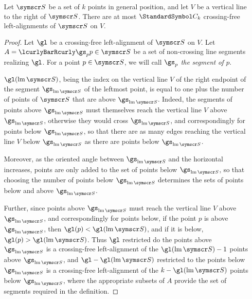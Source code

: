 \documentclass[10pt, a4paper, twoside]{basestyle}
\DeclareMathOperator{\leftmost}{lm}
\newcommand{\CatalanNumber}[1]{\StandardSymbol C_{#1}}
\newcommand{\pointset}{\symscr}
\begin{document}
\begin{lemma}
Let ${\pointset S}$ be a set of $k$ points in general position, and let $V$ be a vertical line to the right of ${\pointset S}$.
There are at most $\CatalanNumber k$ crossing-free left-alignments of ${\pointset S}$ on $V$.
\begin{proof}
Let $\gl$ be a crossing-free left-alignment of ${\pointset S}$ on $V$.
Let $A=\setst{\gs_p}{p\in{\pointset S}}$ be a set of non-crossing line segments realizing $\gl$.
For a point $p\in{\pointset S}$, we will call $\gs_p$ \emph{the segment of $p$}.

$\gl(\leftmost\pointset S)$, being the index on the vertical line $V$ of the right endpoint of the
segment $\gs_{\leftmost\pointset S}$
of the leftmost point,
is equal to one plus the number of points of ${\pointset S}$ that are above $\gs_{\leftmost\pointset S}$.
Indeed, the segments of points above $\gs_{\leftmost\pointset S}$ must
themselves reach the vertical line $V$ above $\gs_{\leftmost\pointset S}$,
otherwise they would cross $\gs_{\leftmost\pointset S}$, and correspondingly for
points below $\gs_{\leftmost\pointset S}$,
so that there are as many edges reaching the vertical line $V$ below $\gs_{\leftmost\pointset S}$ as there are points
below $\gs_{\leftmost\pointset S}$.

Moreover, as the oriented angle between $\gs_{\leftmost\pointset S}$
and the horizontal increases, points are only added to the
set of points below $\gs_{\leftmost\pointset S}$, so that choosing the number of points below
$\gs_{\leftmost\pointset S}$ determines the sets of points
below and above $\gs_{\leftmost\pointset S}$.

Further, since points above $\gs_{\leftmost\pointset S}$ must reach the vertical line $V$ above
$\gs_{\leftmost\pointset S}$, and correspondingly for points below,
if the point $p$ is above $\gs_{\leftmost\pointset S}$, then $\gl(p) < \gl({\leftmost\pointset S})$,
and if it is below, $\gl(p) > \gl({\leftmost\pointset S})$. Thus
$\gl$ restricted do the points above $\gs_{\leftmost\pointset S}$ is a crossing-free left-alignment of
the $\gl({\leftmost\pointset S}) - 1$ points above
$\gs_{\leftmost\pointset S}$, and $\gl-\gl({\leftmost\pointset S})$ restricted to the points below
$\gs_{\leftmost\pointset S}$ is a crossing-free left-alignment of the
$k - \gl({\leftmost\pointset S})$ points below $\gs_{\leftmost\pointset S}$,
where the appropriate subsets of $A$ provide the set of segments required
in the definition.


\end{proof}
\end{lemma}
\end{document}
